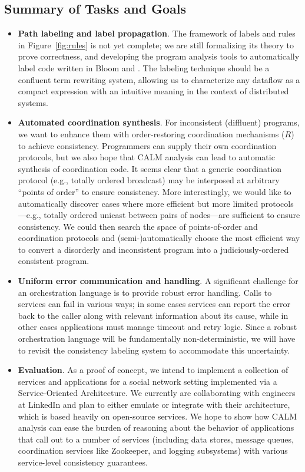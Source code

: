 \subsection{Summary of Tasks and Goals}
\begin{itemize}
\item \textbf{Path labeling and label propagation}.
The framework of labels and rules in Figure~\ref{fig:rules} is not yet complete; we are still formalizing its theory to prove correctness, and developing the program analysis tools to automatically label code written in Bloom and \blooml.  The labeling technique should be a confluent term rewriting system, allowing us to 
characterize any dataflow as a compact expression with an intuitive 
meaning in the context of distributed systems.

\item \textbf{Automated coordination synthesis}.
For inconsistent (diffluent) programs, we want to enhance them with order-restoring coordination mechanisms ($R$) to achieve consistency.
Programmers can supply their own coordination protocols, but we also hope that CALM analysis can lead to automatic synthesis of coordination code. 
It seems clear that a generic coordination 
protocol (e.g., totally ordered broadcast) may be interposed at arbitrary 
``points of order''
to ensure consistency.  More interestingly, we would like to automatically
discover cases where more efficient but more limited protocols---e.g., totally ordered unicast between pairs of nodes---are sufficient to ensure consistency.  We could then search the space of points-of-order and coordination protocols and (semi-)automatically choose the most efficient way to convert a disorderly and inconsistent program into a judiciously-ordered consistent program.

\item \textbf{Uniform error communication and handling}.
A significant challenge for an orchestration language is to provide robust error handling.
Calls to services can fail in various ways; in some cases services can report the error
back to the caller along with relevant information about its cause, while in other cases
applications must manage timeout and retry logic.  Since a robust orchestration language will
be fundamentally non-deterministic, we will have to revisit the consistency labeling system to
accommodate this uncertainty.

\item \textbf{Evaluation}.  As a proof of concept, we intend to implement a collection of services and applications for a social network setting implemented via a Service-Oriented Architecture.  We currently are collaborating with engineers at LinkedIn and plan to either emulate or integrate with their architecture, which is based heavily on open-source services.
We hope to show how CALM analysis can ease the burden of reasoning about the behavior of applications
that call out to a number of services (including data stores, message queues, coordination services like Zookeeper, 
and logging subsystems)
with various service-level consistency guarantees.

\end{itemize}

